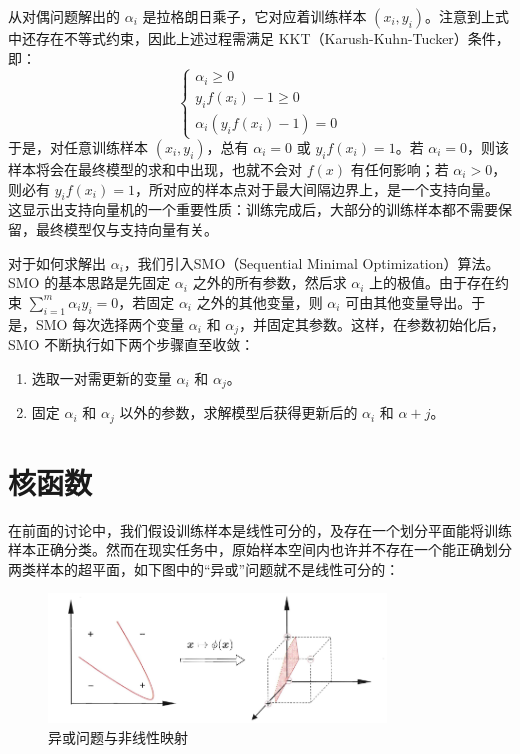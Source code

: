\documentclass[12pt, a4paper]{article} %
\begin{document}
从对偶问题解出的 $\alpha_i$ 是拉格朗日乘子，它对应着训练样本 $(x_i, y_i)$。注意到上式中还存在不等式约束，因此上述过程需满足 KKT（Karush-Kuhn-Tucker）条件，即：
\begin{equation*}
    \left\{\begin{matrix}
        \alpha_i \ge 0       \\
        y_i f(x_i) - 1 \ge 0 \\
        \alpha_i (y_i f(x_i) - 1) = 0
    \end{matrix}\right.
\end{equation*}
于是，对任意训练样本 $(x_i, y_i)$，总有 $\alpha_i = 0$ 或 $y_i f(x_i) = 1$。若 $\alpha_i = 0$，则该样本将会在最终模型的求和中出现，也就不会对 $f(x)$ 有任何影响；若 $\alpha_i > 0$，则必有 $y_i f(x_i) = 1$，所对应的样本点对于最大间隔边界上，是一个支持向量。这显示出支持向量机的一个重要性质：训练完成后，大部分的训练样本都不需要保留，最终模型仅与支持向量有关。

对于如何求解出 $\alpha_i$，我们引入SMO（Sequential Minimal Optimization）算法。SMO 的基本思路是先固定 $\alpha_i$ 之外的所有参数，然后求 $\alpha_i$ 上的极值。由于存在约束 $\displaystyle \sum_{i = 1}^{m} \alpha_i y_i = 0$，若固定 $\alpha_i$ 之外的其他变量，则 $\alpha_i$ 可由其他变量导出。于是，SMO 每次选择两个变量 $\alpha_i$ 和 $\alpha_j$，并固定其参数。这样，在参数初始化后，SMO 不断执行如下两个步骤直至收敛：
\begin{enumerate}[\hspace*{2em} i.]
    \item 选取一对需更新的变量 $\alpha_i$ 和 $\alpha_j$。
    \item 固定 $\alpha_i$ 和 $\alpha_j$ 以外的参数，求解模型后获得更新后的 $\alpha_i$ 和 $\alpha+j$。
\end{enumerate}

\section{核函数}

在前面的讨论中，我们假设训练样本是线性可分的，及存在一个划分平面能将训练样本正确分类。然而在现实任务中，原始样本空间内也许并不存在一个能正确划分两类样本的超平面，如下图中的“异或”问题就不是线性可分的：

\begin{figure}[H]
    \centering
    \includegraphics[width=0.8\textwidth]{../img/6-3-异或问题与非线性映射.png}
    \caption{异或问题与非线性映射}
    \label{fig:异或问题与非线性映射}
\end{figure}
\end{document}
